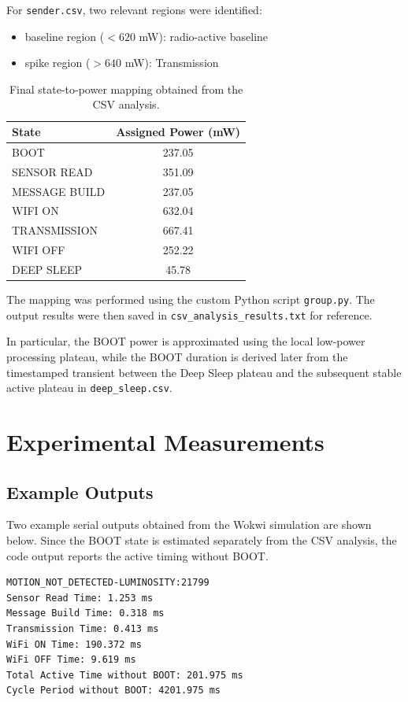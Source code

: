 \documentclass{article}
\begin{document}
For \texttt{sender.csv}, two relevant regions were identified:
\begin{itemize}
    \item baseline region (\(<620\) mW): radio-active baseline
    \item spike region (\(>640\) mW): Transmission
\end{itemize}

\begin{table}[H]
\centering
\begin{tabular}{l c}
\hline
State & Assigned Power (mW) \\
\hline
BOOT & 237.05 \\
SENSOR READ & 351.09 \\
MESSAGE BUILD & 237.05 \\
WIFI ON & 632.04 \\
TRANSMISSION & 667.41 \\
WIFI OFF & 252.22 \\
DEEP SLEEP & 45.78 \\
\hline
\end{tabular}
\caption{Final state-to-power mapping obtained from the CSV analysis.}
\label{tab:state_power_mapping}
\end{table}


The mapping was performed using the custom Python script \texttt{group.py}. The output results were then saved in \texttt{csv\_analysis\_results.txt} for reference.

In particular, the BOOT power is approximated using the local low-power processing plateau, while the BOOT duration is derived later from the timestamped transient between the Deep Sleep plateau and the subsequent stable active plateau in \texttt{deep\_sleep.csv}.

\section{Experimental Measurements}

\subsection{Example Outputs}

Two example serial outputs obtained from the Wokwi simulation are shown below. Since the BOOT state is estimated separately from the CSV analysis, the code output reports the active timing without BOOT.

\begin{verbatim}
MOTION_NOT_DETECTED-LUMINOSITY:21799
Sensor Read Time: 1.253 ms
Message Build Time: 0.318 ms
Transmission Time: 0.413 ms
WiFi ON Time: 190.372 ms
WiFi OFF Time: 9.619 ms
Total Active Time without BOOT: 201.975 ms
Cycle Period without BOOT: 4201.975 ms
\end{verbatim}
\end{document}
